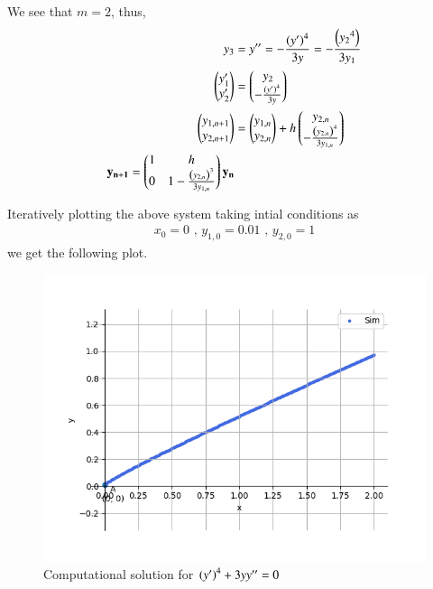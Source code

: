 \documentclass[journal]{IEEEtran}
\begin{document}
We see that $m = 2$, thus,
\begin{align}
    y_3 &= y^{\prime\prime} = -\frac{\left(y^{\prime}\right)^4}{3y} = -\frac{\left({y_2}^4\right)}{3y_1}\\
    \begin{pmatrix}y_1^{\prime}\\y_2^{\prime}\end{pmatrix} &= \begin{pmatrix}y_2\\-\frac{\left(y^{\prime}\right)^4}{3y}\end{pmatrix}\\
    \begin{pmatrix}y_{1, n + 1}\\y_{2, n + 1}\end{pmatrix} &= \begin{pmatrix}y_{1, n}\\y_{2, n}\end{pmatrix} + h\begin{pmatrix}y_{2, n}\\-\frac{\left(y_{2, n}\right)^4}{3y_{1, n}}\end{pmatrix}\\
    \mathbf{y_{n + 1}} = \begin{pmatrix}1 & h\\0 & 1 -\frac{\left(y_{2, n}\right)^3}{3y_{1, n}}\end{pmatrix} \mathbf{y_n}
\end{align}

Iteratively plotting the above system taking intial conditions as 
\begin{align}
    x_0 = 0 \text{ , } y_{1, 0} = 0.01 \text{ , } y_{2, 0} = 1
\end{align}
we get the following plot.

\begin{figure}[h!]
   \centering
   \includegraphics[width=0.7\columnwidth]{figs/graph.png}
   \caption{Computational solution for $\left(y^{\prime}\right)^4 + 3yy^{\prime\prime} = 0$}
   \label{label}
\end{figure}
\end{document}
